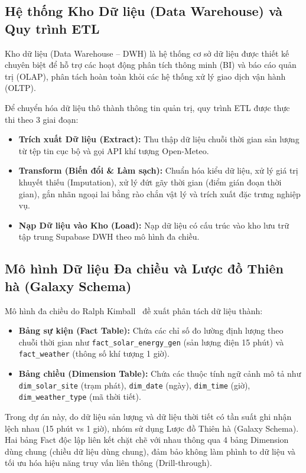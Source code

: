 \documentclass[12pt, a4paper]{report}
\begin{document}
\subsection{Hệ thống Kho Dữ liệu (Data Warehouse) và Quy trình ETL}
Kho dữ liệu (Data Warehouse -- DWH) là hệ thống cơ sở dữ liệu được thiết kế chuyên biệt để hỗ trợ các hoạt động phân tích thông minh (BI) và báo cáo quản trị (OLAP), phân tách hoàn toàn khỏi các hệ thống xử lý giao dịch vận hành (OLTP).

Để chuyển hóa dữ liệu thô thành thông tin quản trị, quy trình ETL được thực thi theo 3 giai đoạn:
\begin{itemize}[noitemsep]
    \item \textbf{Trích xuất Dữ liệu (Extract):} Thu thập dữ liệu chuỗi thời gian sản lượng từ tệp tin cục bộ và gọi API khí tượng Open-Meteo.
    \item \textbf{Transform (Biến đổi \& Làm sạch):} Chuẩn hóa kiểu dữ liệu, xử lý giá trị khuyết thiếu (Imputation), xử lý đứt gãy thời gian (điểm gián đoạn thời gian), gắn nhãn ngoại lai bằng rào chắn vật lý và trích xuất đặc trưng nghiệp vụ.
    \item \textbf{Nạp Dữ liệu vào Kho (Load):} Nạp dữ liệu có cấu trúc vào kho lưu trữ tập trung Supabase DWH theo mô hình đa chiều.
\end{itemize}

\subsection{Mô hình Dữ liệu Đa chiều và Lược đồ Thiên hà (Galaxy Schema)}
Mô hình đa chiều do Ralph Kimball~\cite{kimball2013dwh} đề xuất phân tách dữ liệu thành:
\begin{itemize}[noitemsep]
    \item \textbf{Bảng sự kiện (Fact Table):} Chứa các chỉ số đo lường định lượng theo chuỗi thời gian như \texttt{fact\_solar\_energy\_gen} (sản lượng điện 15 phút) và \texttt{fact\_weather} (thông số khí tượng 1 giờ).
    \item \textbf{Bảng chiều (Dimension Table):} Chứa các thuộc tính ngữ cảnh mô tả như \texttt{dim\_solar\_site} (trạm phát), \texttt{dim\_date} (ngày), \texttt{dim\_time} (giờ), \texttt{dim\_weather\_type} (mã thời tiết).
\end{itemize}

Trong dự án này, do dữ liệu sản lượng và dữ liệu thời tiết có tần suất ghi nhận lệch nhau (15 phút vs 1 giờ), nhóm sử dụng Lược đồ Thiên hà (Galaxy Schema). Hai bảng Fact độc lập liên kết chặt chẽ với nhau thông qua 4 bảng Dimension dùng chung (chiều dữ liệu dùng chung), đảm bảo không làm phình to dữ liệu và tối ưu hóa hiệu năng truy vấn liên thông (Drill-through).
\end{document}
